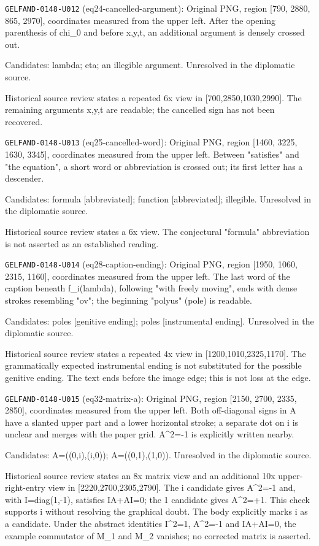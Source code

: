 \noindent\texttt{GELFAND-0148-U012} (eq24-cancelled-argument): Original PNG, region [790, 2880, 865, 2970], coordinates measured from the upper left. After the opening parenthesis of chi\_0 and before x,y,t, an additional argument is densely crossed out.\par
Candidates: lambda; eta; an illegible argument. Unresolved in the diplomatic source.\par
Historical source review states a repeated 6x view in [700,2850,1030,2990]. The remaining arguments x,y,t are readable; the cancelled sign has not been recovered.\par

\noindent\texttt{GELFAND-0148-U013} (eq25-cancelled-word): Original PNG, region [1460, 3225, 1630, 3345], coordinates measured from the upper left. Between "satisfies" and "the equation", a short word or abbreviation is crossed out; its first letter has a descender.\par
Candidates: formula [abbreviated]; function [abbreviated]; illegible. Unresolved in the diplomatic source.\par
Historical source review states a 6x view. The conjectural "formula" abbreviation is not asserted as an established reading.\par

\noindent\texttt{GELFAND-0148-U014} (eq28-caption-ending): Original PNG, region [1950, 1060, 2315, 1160], coordinates measured from the upper left. The last word of the caption beneath f\_i(lambda), following "with freely moving", ends with dense strokes resembling "ov"; the beginning "polyus" (pole) is readable.\par
Candidates: poles [genitive ending]; poles [instrumental ending]. Unresolved in the diplomatic source.\par
Historical source review states a repeated 4x view in [1200,1010,2325,1170]. The grammatically expected instrumental ending is not substituted for the possible genitive ending. The text ends before the image edge; this is not loss at the edge.\par

\noindent\texttt{GELFAND-0148-U015} (eq32-matrix-a): Original PNG, region [2150, 2700, 2335, 2850], coordinates measured from the upper left. Both off-diagonal signs in A have a slanted upper part and a lower horizontal stroke; a separate dot on i is unclear and merges with the paper grid. A\textasciicircum{}2=-1 is explicitly written nearby.\par
Candidates: A=((0,i),(i,0)); A=((0,1),(1,0)). Unresolved in the diplomatic source.\par
Historical source review states an 8x matrix view and an additional 10x upper-right-entry view in [2220,2700,2305,2790]. The i candidate gives A\textasciicircum{}2=-1 and, with I=diag(1,-1), satisfies IA+AI=0; the 1 candidate gives A\textasciicircum{}2=+1. This check supports i without resolving the graphical doubt. The body explicitly marks i as a candidate. Under the abstract identities I\textasciicircum{}2=1, A\textasciicircum{}2=-1 and IA+AI=0, the example commutator of M\_1 and M\_2 vanishes; no corrected matrix is asserted.\par

